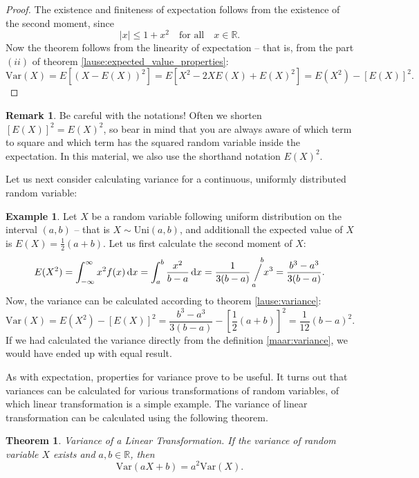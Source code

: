 \documentclass[12pt,a4paper,leqno]{report}
\newcommand{\R}{\mathbb{R}}
\newcommand{\dif}{\,\mathrm{d}}
\newcommand{\sijoitus}[2]{\mathop{\Big/}\limits_{\hspace{-0.85em}{#1}}^{\hspace{0.85em}{#2}}\hspace{-0.2em}}
\newcommand{\var}{\mathrm{Var}}
\theoremstyle{plain}
\newtheorem{lause}[equation]{Theorem}
\theoremstyle{definition}
\newtheorem{esim}[equation]{Example}
\newtheorem{remark}[equation]{Remark}
\begin{document}
\begin{proof}
The existence and finiteness of expectation follows from the existence of the second moment, since
\[
|x| \leq 1 + x^2 \quad \text{for all} \quad x \in \R.
\]
Now the theorem follows from the linearity of expectation -- that is, from the part $(ii)$ of theorem \ref{lause:expected_value_properties}:
\[
\var (X) = E\left[(X - E(X))^2\right] = E\left[X^2 - 2XE(X) + E(X)^2\right] = E(X^2) - [E(X)]^2.
\]
\end{proof}

\begin{remark}
Be careful with the notations! Often we shorten $[E(X)]^2=E(X)^2$, so bear in mind that you are always aware of which term to square and which term has the squared random variable inside the expectation. In this material, we also use the shorthand notation $E(X)^2$. 
\end{remark}

Let us next consider calculating variance for a continuous, uniformly distributed random variable:

\begin{esim}
Let $X$ be a random variable following uniform distribution on the interval $(a,b)$ -- that is $X \sim \text{Uni}(a,b)$, and additionall the expected value of $X$ is $E(X) = \frac{1}{2}(a+b)$. Let us first calculate the second moment of $X$:
\[
E(X^2) = \int_{-\infty}^\infty x^2 f(x)\dif x = \int_a^b \frac{x^2}{b-a} \dif x= \frac{1}{3(b-a)} \sijoitus{a}{b} x^3 = \frac{b^3 - a^3}{3(b-a)}. 
\] 
Now, the variance can be calculated according to theorem \ref{lause:variance}:
\[
\var(X) = E(X^2) - [E(X)]^2 = \frac{b^3 - a^3}{3(b-a)} - \left[\frac{1}{2}(a+b)\right]^2 = \frac{1}{12}(b-a)^2.
\]
If we had calculated the variance directly from the definition \ref{maar:variance}, we would have ended up with equal result.
\end{esim}

As with expectation, properties for variance prove to be useful. It turns out that variances can be calculated for various transformations of random variables, of which linear transformation is a simple example. The variance of linear transformation can be calculated using the following theorem.

\begin{lause}
Variance of a Linear Transformation. If the variance of random variable $X$ exists and $a,b \in \R$, then
\[
\var(aX + b) = a^2\var(X).
\]
\end{lause}
\end{document}
